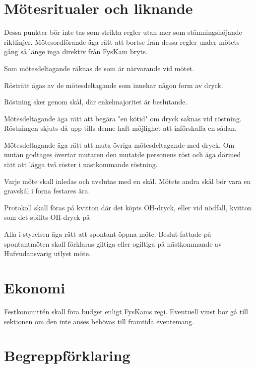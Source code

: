 \documentclass{dgovdoc}
\begin{document}
\section{Mötesritualer och liknande}

Dessa punkter bör inte tas som strikta regler utan mer som stämningshöjande riktlinjer. Mötesordförande äga rätt att bortse från dessa regler under mötets gång så länge inga direktiv från FysKam bryts.

Som mötesdeltagande räknas de som är närvarande vid mötet.

Rösträtt ägas av de mötesdeltagande som innehar någon form av dryck.

Röstning sker genom skål, där enkelmajoritet är beslutande.

Mötesdeltagande äga rätt att begära "en kötid" om dryck saknas vid röstning. Röstningen skjuts då upp tills denne haft möjlighet att införskaffa en sådan.

Mötesdeltagande äga rätt att muta övriga mötesdeltagande med dryck. Om mutan godtages övertar mutaren den mutatde personens röst och äga därmed rätt att lägga två röster i nästkommande röstning.

Varje möte skall inledas och avslutas med en skål. Mötets andra skål bör vara en gravskål i forna festares ära.

Protokoll skall föras på kvitton där det köpts OH-dryck, eller vid nödfall, kvitton som det spillts OH-dryck på

Alla i styrelsen äga rätt att spontant öppna möte. Beslut fattade på spontantmöten skall förklaras giltiga eller ogiltiga på nästkommande av Hufvudansvarig utlyst möte.

\section{Ekonomi}

Festkommittén skall föra budget enligt FysKams regi.
Eventuell vinst bör gå till sektionen om den inte anses behövas till framtida eventemang.

\section{Begreppförklaring}
\end{document}
